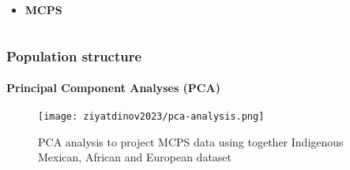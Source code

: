 \begin{frame}
\begin{columns}
        \begin{column}{0.33\textwidth}
            \begin{itemize}[noitemsep,topsep=0pt]
                \item \textbf{\sffamily\color{primary-color} MCPS}
            \end{itemize}
        \end{column}
    \end{columns}
\end{frame}

\begin{frame}
    \frametitle{Population structure}
    \framesubtitle{Principal Component Analyses (PCA)}

    \begin{figure}[htpb]
        \centering
        \texttt{[image: ziyatdinov2023/pca-analysis.png]}
        \caption{PCA analysis to project MCPS data using together Indigenous Mexican, African and European dataset}
        \label{fig:pca}
    \end{figure}

\end{frame}

%    
%
%
%    
